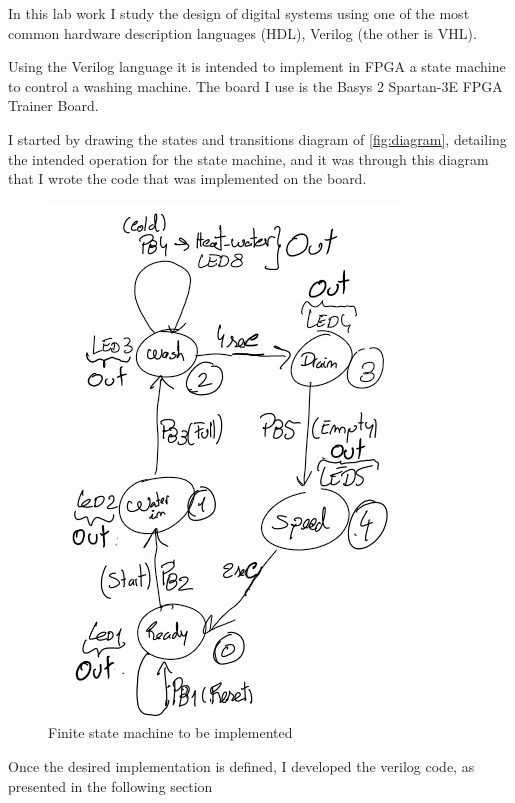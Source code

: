 In this lab work I study the design of digital systems using one of the most common hardware description languages (HDL), Verilog (the other is VHL).

Using the Verilog language it is intended to implement in FPGA a state machine to control a washing machine. The board I use is the Basys 2 Spartan-3E FPGA Trainer Board.

I started by drawing the states and transitions diagram of \autoref{fig:diagram}, detailing the intended operation for the state machine, and it was through this diagram that I wrote the code that was implemented on the board.

\begin{figure}[H]
	\centering
	\includegraphics[width=.60\textwidth]{img/diagram}
	\caption{Finite state machine to be implemented}
	\label{fig:diagram}
\end{figure}

Once the desired implementation is defined, I developed the verilog code, as presented in the following section

